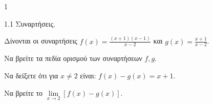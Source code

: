\begin{ylh}{1}
    \item 1.1 Συναρτήσεις.
\end{ylh}
Δίνονται οι συναρτήσεις $f(x) = \frac{(x+1)(x-1)}{x-2}$ και $g(x) = \frac{x+1}{x-2}$.
\begin{alist}
	\item Να βρείτε τα πεδία ορισμού των συναρτήσεων $f, g$. 
	\item Να δείξετε ότι για $x \neq 2$ είναι: $f(x) - g(x) = x+1$. 
	\item Να βρείτε το $\lim\limits_{x\to 2}[f(x)-g(x)]$. 
\end{alist}

